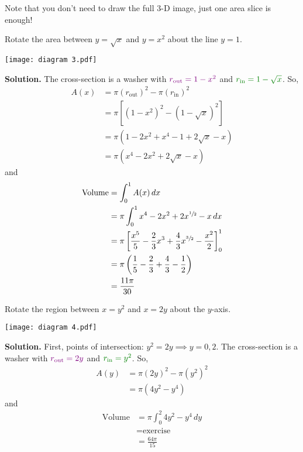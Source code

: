 Note that you don't need to draw the full 3-D image, just one area slice is enough!

\begin{Example}{}{}
    Rotate the area between $ y=\sqrt{x} $ and $ y=x^2 $ about the line $ y=1 $.

    \begin{center}
        \texttt{[image: diagram 3.pdf]}
    \end{center}

    \textbf{Solution.} The cross-section is a washer with $ \color[rgb]{0.5,0,0.5}r_{\text{out}}=1-x^2 $ and
    $ \color[rgb]{0,0.5,0} r_{\text{in}}=1-\sqrt{x} $. So,
    \begin{align*}
        A(x)
         & =\pi(r_{\text{out}})^2-\pi(r_\text{in})^2   \\
         & =\pi\left[ (1-x^2)^2-(1-\sqrt{x})^2 \right] \\
         & =\pi(1-2x^2+x^4-1+2\sqrt{x}-x)              \\
         & =\pi(x^4-2x^2+2\sqrt{x}-x)
    \end{align*}
    and
    \begin{align*}
        \text{Volume}
         & =\int_{0}^{1} A(x)\, d{x}                                                                        \\
         & =\pi \int_{0}^{1} x^4-2x^2+2x^{\sfrac{1}{2}}-x\, d{x}                                            \\
         & =\pi\left[ \frac{x^5}{5} -\frac{2}{3} x^3+\frac{4}{3} x^{\sfrac{3}{2}}-\frac{x^2}{2} \right]_0^1 \\
         & =\pi\left( \frac{1}{5} -\frac{2}{3} +\frac{4}{3} -\frac{1}{2} \right)                            \\
         & =\frac{11\pi}{30}
    \end{align*}
\end{Example}


\begin{Example}{}{}
    Rotate the region between $ x=y^2 $ and $ x=2y $ about the $ y $-axis.

    \begin{center}
        \texttt{[image: diagram 4.pdf]}
    \end{center}

    \textbf{Solution.} First, points of intersection: $ y^2=2y\implies y=0,2 $.
    The cross-section is a washer with $ \color[rgb]{0.5,0,0.5} r_{\text{out}}=2y $ and
    $ \color[rgb]{0,0.5,0}  r_{\text{in}}=y^2 $. So,
    \begin{align*}
        A(y)
         & =\pi\left(2y\right)^2-\pi\left(y^2\right)^2 \\
         & =\pi\left( 4y^2-y^4 \right)
    \end{align*}
    and
    \begin{align*}
        \text{Volume}
         & =\pi \int_{0}^{2} 4y^2-y^4\, d{y} \\
         & =\text{exercise}                  \\
         & =\frac{64\pi}{15}
    \end{align*}
\end{Example}

